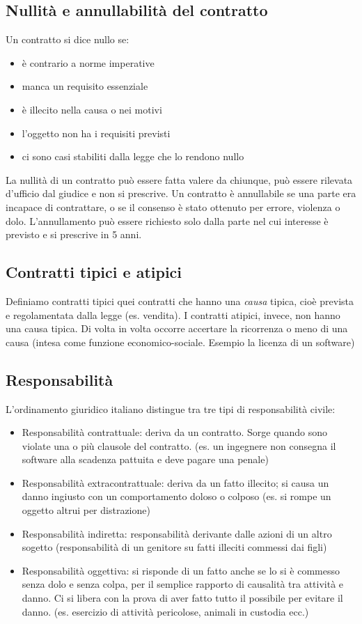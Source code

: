 \subsection{Nullità e annullabilità del contratto}
Un contratto si dice nullo se:
\begin{itemize}
    \item è contrario a norme imperative
    \item manca un requisito essenziale
    \item è illecito nella causa o nei motivi
    \item l'oggetto non ha i requisiti previsti
    \item ci sono casi stabiliti dalla legge che lo rendono nullo
\end{itemize}
La nullità di un contratto può essere fatta valere da chiunque, può essere rilevata d'ufficio dal giudice e non si prescrive.
\newline
Un contratto è annullabile se una parte era incapace di contrattare, o se il consenso è stato ottenuto per errore, violenza o dolo.\newline
L'annullamento può essere richiesto solo dalla parte nel cui interesse è previsto e si prescrive in 5 anni.
\subsection{Contratti tipici e atipici}
Definiamo contratti tipici quei contratti che hanno una \emph{causa} tipica, cioè prevista e regolamentata dalla legge (es. vendita).\newline
I contratti atipici, invece, non hanno una causa tipica. Di volta in volta occorre accertare la ricorrenza o meno di una causa 
(intesa come funzione economico-sociale. Esempio la licenza di un software)

\subsection{Responsabilità}
L'ordinamento giuridico italiano distingue tra tre tipi di responsabilità civile:
\begin{itemize}
    \item Responsabilità contrattuale: deriva da un contratto. Sorge quando sono violate una o più clausole del contratto. 
    (es. un ingegnere non consegna il software alla scadenza pattuita e deve pagare una penale)
    \item Responsabilità extracontrattuale: deriva da un fatto illecito; si causa un danno ingiusto con un comportamento doloso o colposo 
    (es. si rompe un oggetto altrui per distrazione)
    \item Responsabilità indiretta: responsabilità derivante dalle azioni di un altro sogetto 
    (responsabilità di un genitore su fatti illeciti commessi dai figli)
    \item Responsabilità oggettiva: si risponde di un fatto anche se lo si è commesso senza dolo e senza colpa, per il semplice
    rapporto di causalità tra attività e danno. Ci si libera con la prova di aver fatto tutto il possibile per evitare il danno. 
    (es. esercizio di attività pericolose, animali in custodia ecc.)
\end{itemize}

